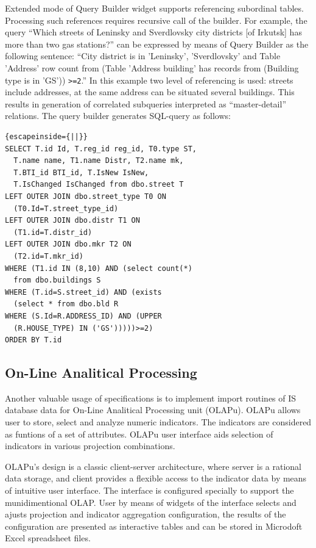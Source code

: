 \documentclass[conference]{IEEEtran}
\begin{document}
Extended mode of Query Builder widget supports referencing subordinal tables.  Processing such references requires recursive call of the builder.  For example, the query ``Which streets of Leninsky and Sverdlovsky city districts [of Irkutsk] has more than two gas stations?'' can be expressed by means of Query Builder as the following sentence: ``City district is in 'Leninsky', 'Sverdlovsky' and Table 'Address' row count from (Table 'Address building' has records from (Building type is in 'GS')) \verb|>=2|.''  In this example two level of referencing is used: streets include addresses, at the same address can be situated several buildings.  This results in generation of correlated subqueries interpreted as ``master-detail'' relations.  The query builder generates SQL-query as follows:
\begin{lstlisting}{escapeinside={||}}
SELECT T.id Id, T.reg_id reg_id, T0.type ST,
  T.name name, T1.name Distr, T2.name mk,
  T.BTI_id BTI_id, T.IsNew IsNew,
  T.IsChanged IsChanged from dbo.street T
LEFT OUTER JOIN dbo.street_type T0 ON
  (T0.Id=T.street_type_id)
LEFT OUTER JOIN dbo.distr T1 ON
  (T1.id=T.distr_id)
LEFT OUTER JOIN dbo.mkr T2 ON
  (T2.id=T.mkr_id)
WHERE (T1.id IN (8,10) AND (select count(*)
  from dbo.buildings S
WHERE (T.id=S.street_id) AND (exists
  (select * from dbo.bld R
WHERE (S.Id=R.ADDRESS_ID) AND (UPPER
  (R.HOUSE_TYPE) IN ('GS')))))>=2)
ORDER BY T.id
\end{lstlisting}

\subsection{On-Line Analitical Processing}
\label{sec:olap}

Another valuable usage of specifications is to implement import routines of IS database data for On-Line Analitical Processing unit (OLAPu).  OLAPu allows user to store, select and analyze numeric indicators.  The indicators are considered as funtions of a set of attributes.  OLAPu  user interface aids selection of indicators in various projection combinations.

OLAPu's design is a classic client-server architecture, where server is a rational data storage, and client provides a flexible access to the indicator data by means of intuitive user interface.  The interface is configured specially to support the munidimentional OLAP.  User by means of widgets of the interface selects and ajusts projection and indicator aggregation configuration, the results of the configuration are presented as interactive tables and can be stored in Microdoft Excel spreadsheet files.
\end{document}
